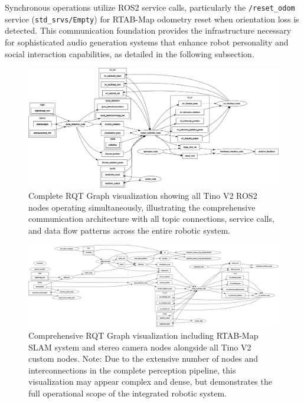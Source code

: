 Synchronous operations utilize ROS2 service calls, particularly the \texttt{/reset\_odom} service (\texttt{std\_srvs/Empty}) for RTAB-Map odometry reset when orientation loss is detected. This communication foundation provides the infrastructure necessary for sophisticated audio generation systems that enhance robot personality and social interaction capabilities, as detailed in the following subsection.

\begin{figure}[H]
    \centering
    \includegraphics[width=\textwidth]{Images/fulltinonodes.png}
    \caption{Complete RQT Graph visualization showing all Tino V2 ROS2 nodes operating simultaneously, illustrating the comprehensive communication architecture with all topic connections, service calls, and data flow patterns across the entire robotic system.}
    \label{fig:rqt_complete_system}
\end{figure}

\begin{figure}[H]
    \centering
    \includegraphics[width=\textwidth]{Images/TinoWithRTAB.png}
    \caption{Comprehensive RQT Graph visualization including RTAB-Map SLAM system and stereo camera nodes alongside all Tino V2 custom nodes. Note: Due to the extensive number of nodes and interconnections in the complete perception pipeline, this visualization may appear complex and dense, but demonstrates the full operational scope of the integrated robotic system.}
    \label{fig:rqt_complete_system_with_rtab}
\end{figure}

